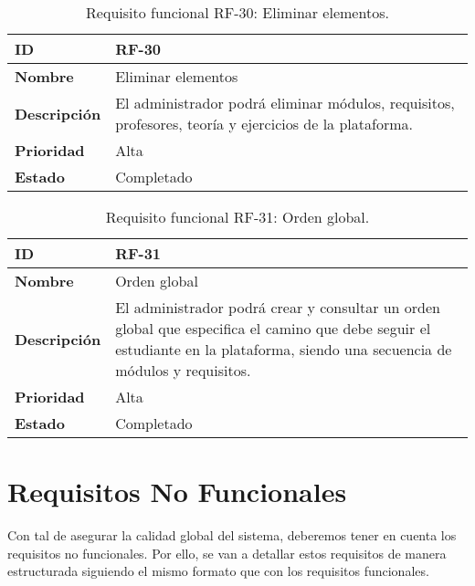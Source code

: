 \begin{table}[H]
    \centering
    \begin{tabular}{|l|p{9.5cm}|}
        \hline
        \textbf{ID} & RF-30 \\
        \hline
        \textbf{Nombre} & Eliminar elementos \\
        \hline
        \textbf{Descripción} & El administrador podrá eliminar módulos, requisitos, profesores, teoría y ejercicios de la plataforma. \\
        \hline
        \textbf{Prioridad} & Alta \\
        \hline
        \textbf{Estado} & Completado \\
        \hline
    \end{tabular}
    \caption{Requisito funcional RF-30: Eliminar elementos.}
    \label{table:req-RF00R}
\end{table}

\begin{table}[H]
    \centering
    \begin{tabular}{|l|p{9.5cm}|}
        \hline
        \textbf{ID} & RF-31 \\
        \hline
        \textbf{Nombre} & Orden global \\
        \hline
        \textbf{Descripción} & El administrador podrá crear y consultar un orden global que especifica el camino que debe seguir el estudiante en la plataforma, siendo una secuencia de módulos y requisitos. \\
        \hline
        \textbf{Prioridad} & Alta \\
        \hline
        \textbf{Estado} & Completado \\
        \hline
    \end{tabular}
    \caption{Requisito funcional RF-31: Orden global.}
    \label{table:req-RF00S}
\end{table}


\section{Requisitos No Funcionales}

Con tal de asegurar la calidad global del sistema, deberemos tener en cuenta los requisitos no funcionales. Por ello, se van a detallar estos requisitos de manera estructurada siguiendo el mismo formato que con los requisitos funcionales.

